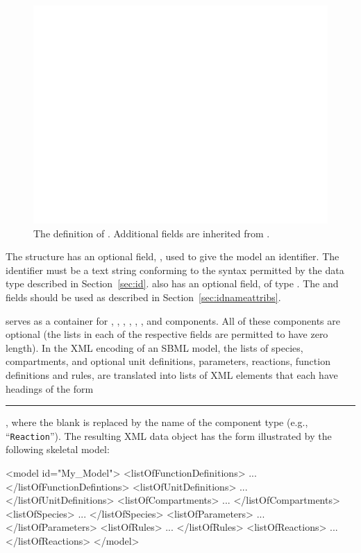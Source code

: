 \documentclass[10pt,twocolumntoc]{cekarticle}
\begin{document}
\begin{figure}[htb]
  \centering
  \includegraphics[scale = 0.68]{model}
  \caption{The definition of .  Additional fields are
    inherited from .}
  \label{fig:model}
\end{figure}

The  structure has an optional field, , used to
give the model an identifier.  The identifier must be a text string
conforming to the syntax permitted by the  data type described
in Section~\ref{sec:id}.   also has an optional 
field, of type .  The  and  fields
should be used as described in Section~\ref{sec:idnameattribs}.

 serves as a container for ,
, , ,
, , and  components.  All of
these components are optional (the lists in each of the respective fields
are permitted to have zero length).  In the XML encoding of an SBML model,
the lists of species, compartments, and optional unit definitions,
parameters, reactions, function definitions and rules, are translated into
lists of XML elements that each have headings of the form
\rule{0.5in}{0.5pt}, where the blank is replaced by
the name of the component type (e.g., ``\texttt{Reaction}'').  The
resulting XML data object has the form illustrated by the following
skeletal model:

\begin{example}
<model id="My_Model">
    <listOfFunctionDefinitions>
        ...
    </listOfFunctionDefintions>
    <listOfUnitDefinitions>
        ...
    </listOfUnitDefinitions>
    <listOfCompartments>
        ...
    </listOfCompartments>
    <listOfSpecies>
        ...
    </listOfSpecies>
    <listOfParameters>
        ...
    </listOfParameters>
    <listOfRules>
        ...
    </listOfRules>
    <listOfReactions>
        ...
    </listOfReactions>
</model>
\end{example}
\end{document}
